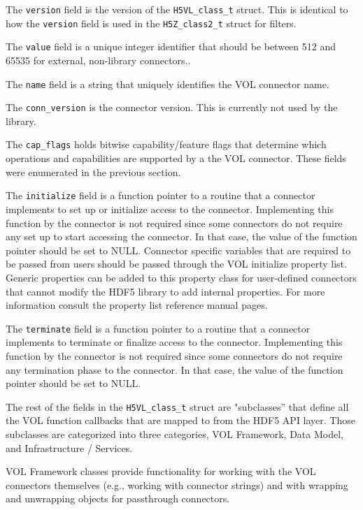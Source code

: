 The \texttt{version} field is the version of the \texttt{H5VL\_class\_t} struct. This is identical to how the \texttt{version} field is used in the \texttt{H5Z\_class2\_t} struct for filters. 

The \texttt{value} field is a unique integer identifier that should be between 512 and 65535 for external, non-library connectors..

The \texttt{name} field is a string that uniquely identifies the VOL connector name.

The \texttt{conn\_version} is the connector version. This is currently not used by the library.

The \texttt{cap\_flags} holds bitwise capability/feature flags that determine which operations and capabilities are supported by a the VOL connector. These fields were enumerated in the previous section.

The \texttt{initialize} field is a function pointer to a routine that a connector implements to set up or initialize access to the connector. Implementing this function by the connector is not required since some connectors do not require any set up to start accessing the connector. In that case, the value of the function pointer should be set to NULL. Connector specific variables that are required to be passed from users should be passed through the VOL initialize property list. Generic properties can be added to this property class for user-defined connectors that cannot modify the HDF5 library to add internal properties. For more information consult the property list reference manual pages.

The \texttt{terminate} field is a function pointer to a routine that a connector implements to terminate or finalize access to the connector. Implementing this function by the connector is not required since some connectors do not require any termination phase to the connector. In that case, the value of the function pointer should be set to NULL.

The rest of the fields in the \texttt{H5VL\_class\_t} struct are "subclasses'' that define all the VOL function callbacks that
are mapped to from the HDF5 API layer. Those subclasses are categorized into three categories, VOL Framework, Data Model, and Infrastructure / Services.

VOL Framework classes provide functionality for working with the VOL connectors themselves (e.g., working with connector strings) and with wrapping and unwrapping objects for passthrough connectors.

